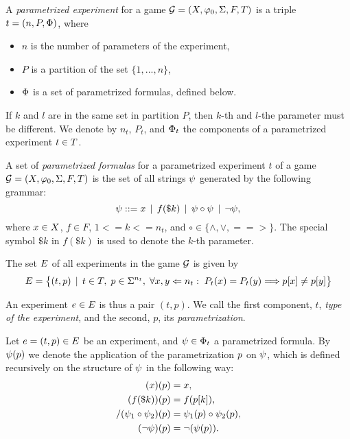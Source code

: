 \begin{definition} \label{def:game}
A \emph{parametrized experiment} for a game $\mathcal{G} = (X, \varphi_0, \Sigma, F, T)$
is a triple
  $t = (n, P, \Phi)$, where
  \begin{itemize}
  \item $n$ is the number of parameters of the experiment,
  \item $P$ is a partition of the set $\{1, ..., n\}$,
  \item $\Phi$ is a set of parametrized formulas, defined below.
  \end{itemize}
If $k$ and $l$ are in the same set in partition $P$, then $k$-th and
$l$-the parameter must be different.
We denote by $n_t$, $P_t$, and $\Phi_t$ the components of
  a parametrized experiment $t\in T$.
\end{definition}

\begin{definition} \label{def-pform}
A set of \emph{parametrized formulas} for a parametrized experiment
$t$ of a game $\mathcal{G} = (X, \varphi_0, \Sigma, F, T)$
  is the set of
  all strings $\psi$ generated by the following grammar:
  $$ \psi ::= x \:\:|\:\: f(\$k) \:\:|\:\: \psi \circ \psi \:\:|\:\: \neg \psi,$$
  where $x\in X$, $f\in F$, $1<= k <= n_t$,
  and $\circ\in\{\wedge, \vee, ==>\}$.
The special symbol $\$k$ in $f(\$k)$ is used to denote the $k$-th parameter.
\end{definition}

The set $E$ of all experiments in the game $\mathcal{G}$ is given by
\[
  E =
     \big\{ (t, p) \:\:|\:\: t\in T,\; p \in\Sigma^{n_t},\;
     \forall x,y<={n_t}:\; P_t(x)=P_t(y) ==> p[x] \not= p[y] \big\}
\]

An experiment $e\in E$ is thus a pair $(t, p)$.
We call the first component, $t$, \emph{type of the experiment},
 and the second, $p$, its \emph{parametrization}.

Let $e = (t, p)\in E$ be an experiment,
  and $\psi\in\Phi_t$ a parametrized formula.
By $\psi(p)$ we denote the application of
  the parametrization $p$ on $\psi$,
  which is defined recursively on the structure of $\psi$
  in the following way:
\begin{align}
(x)(p) &= x, \\
(f(\$k))(p) &= f(p[k]),\\
/(\psi_1\circ\psi_2)(p) &= \psi_1(p) \circ \psi_2(p),\\
(\neg\psi)(p) &= \neg(\psi(p)).
\end{align}

